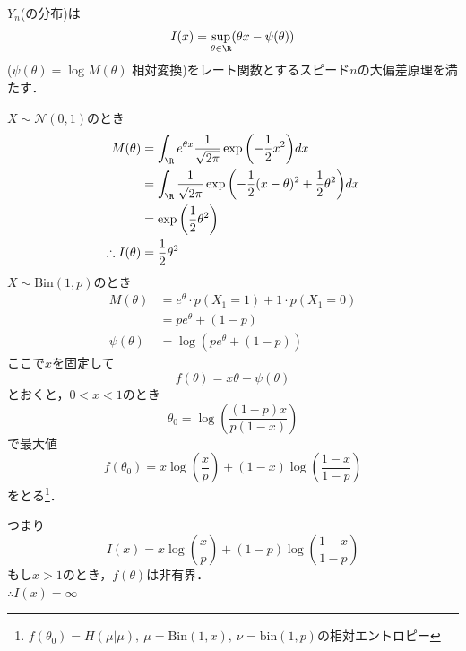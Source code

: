    $Y_n$(の分布)は
\begin{equation}
    I(x)= \sup_{\theta\in \R}(\theta x- \psi(\theta))
\end{equation}
    ($\psi(\theta)= \log{M(\theta)}$ 相対変換)をレート関数とするスピード$n$の大偏差原理を満たす．

    $X\sim \mathcal{N}(0, 1)$のとき
\begin{align}
    M(\theta)
    &= \int_\R e^{\theta x} \frac{1}{\sqrt{2\pi}}\exp{\left(-\frac{1}{2}x^2\right)}dx\\
    &= \int_\R\frac{1}{\sqrt{2\pi}}\exp{\left(-\frac{1}{2}(x- \theta)^2+ \frac{1}{2}\theta^2\right)}dx\\
    &= \exp{\left(\frac{1}{2}\theta^2\right)}\\
    \therefore I(\theta)&= \frac{1}{2}\theta^2
\end{align}
$X\sim \mathrm{Bin}(1, p)$のとき
\begin{align}
    M(\theta)
    &= e^\theta\cdot p(X_1= 1)+ 1\cdot p(X_1= 0)\\
    &= pe^\theta+ (1- p)\\
    \psi(\theta)&= \log{(pe^\theta+ (1- p))}
\end{align}
    ここで$x$を固定して
\begin{equation}
    f(\theta)= x\theta- \psi(\theta)
\end{equation}
    とおくと，$0< x< 1$のとき
\begin{equation}
    \theta_0= \log{\left(\frac{(1- p)x}{p(1- x)}\right)}
\end{equation}
    で最大値
\begin{equation}
    f(\theta_0)= x\log{\left(\frac{x}{p}\right)}+ (1- x)\log{\left(\frac{1- x}{1- p}\right)}
\end{equation}
    をとる\footnote{$f(\theta_0)= H(\mu|\mu),\ \mu= \mathrm{Bin}(1, x),\ \nu= \mathrm{bin}(1, p)$の相対エントロピー}．

    つまり
\begin{equation}
    I(x)= x\log{\left(\frac{x}{p}\right)}+ (1- p)\log{\left(\frac{1- x}{1- p}\right)}
\end{equation}
    もし$x> 1$のとき，$f(\theta)$は非有界．\\
    $\therefore I(x)= \infty$

